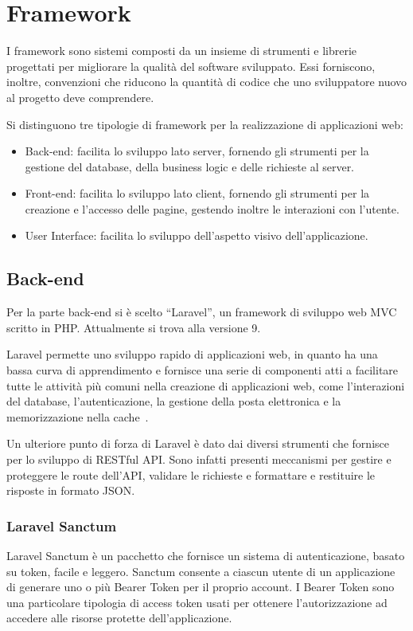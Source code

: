 \section{Framework}
I framework sono sistemi composti da un insieme di strumenti e librerie progettati per migliorare la qualit\`a del software sviluppato. Essi forniscono, inoltre, convenzioni che riducono la quantit\`a di codice che uno sviluppatore nuovo al progetto deve comprendere.

Si distinguono tre tipologie di framework per la realizzazione di applicazioni web:
\begin{itemize}
	\item Back-end: facilita lo sviluppo lato server, fornendo gli strumenti per la gestione del database, della business logic e delle richieste al server.
	\item Front-end: facilita lo sviluppo lato client, fornendo gli strumenti per la creazione e l'accesso delle pagine, gestendo inoltre le interazioni con l'utente.
	\item User Interface: facilita lo sviluppo dell'aspetto visivo dell'applicazione.
\end{itemize}

\subsection{Back-end}
Per la parte back-end si \`e scelto ``Laravel'', un framework di sviluppo web MVC scritto in PHP. Attualmente si trova alla versione 9.

Laravel permette uno sviluppo rapido di applicazioni web, in quanto ha una bassa curva di apprendimento e fornisce una serie di componenti atti a facilitare tutte le attivit\`a pi\`u comuni nella creazione di applicazioni web, come l'interazioni del database, l'autenticazione, la gestione della posta elettronica e la memorizzazione nella cache~\cite{Stauffer}. 

Un ulteriore punto di forza di Laravel \`e dato dai diversi strumenti che fornisce per lo sviluppo di RESTful API. Sono infatti presenti meccanismi per gestire e proteggere le route dell'API, validare le richieste e formattare e restituire le risposte in formato JSON. 
\subsubsection{Laravel Sanctum}
Laravel Sanctum \`e un pacchetto che fornisce un sistema di autenticazione, basato su token, facile e leggero. Sanctum consente a ciascun utente di un applicazione di generare uno o pi\`u Bearer Token per il proprio account. I Bearer Token sono una particolare tipologia di access token usati per ottenere l'autorizzazione ad accedere alle risorse protette dell'applicazione.
